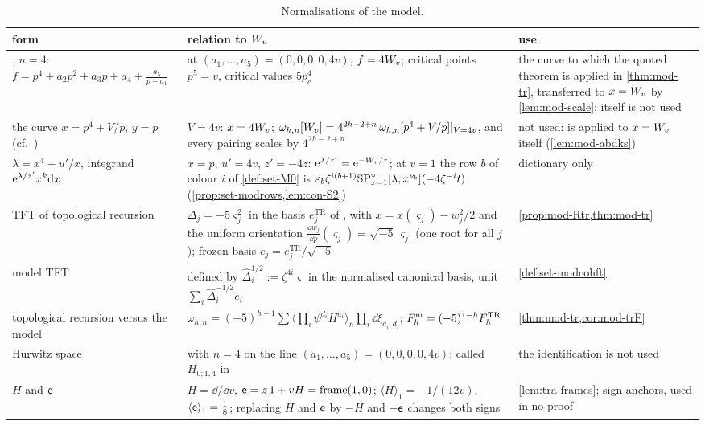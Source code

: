 \begin{table}[ht]
\caption{Normalisations of the model.}
\label{tab:sgn-model}
\centering
\footnotesize
\renewcommand{\arraystretch}{1.2}
\begin{tabular}{@{}>{\raggedright\arraybackslash}p{}>{\raggedright\arraybackslash}p{}>{\raggedright\arraybackslash}p{}@{}}
\hline
form & relation to $W_{v}$ & use \\
\hline
\cite[(8-1)]{Dunin-Barkowski:2015caa}, $n=4$: $f=p^4+a_2p^2+a_3p+a_4+\frac{a_5}{p-a_1}$ & at $(a_1,\dots,a_5)=(0,0,0,0,4v)$, $f=4W_{v}$; critical points $p^5=v$, critical values $5p_c^4$ & the curve to which the quoted theorem is applied in \cref{thm:mod-tr}, transferred to $x=W_{v}$ by \cref{lem:mod-scale}; \cite[\S8]{Dunin-Barkowski:2015caa} itself is not used \\
the curve $x=p^4+V/p$, $y=p$ (cf.\ \cite[(7.2)]{ABDKS25}) & $V=4v$: $x=4W_{v}$; $\omega_{h,n}[W_{v}]=4^{2h-2+n}\,\omega_{h,n}[p^4+V/p]|_{V=4v}$, and every pairing scales by $4^{2h-2+n}$ & not used: \cite[Theorem~7.1]{ABDKS25} is applied to $x=W_{v}$ itself (\cref{lem:mod-abdks}) \\
$\lambda=x^4+u'/x$, integrand $\mathrm{e}^{\lambda/z'}x^k\mathrm{d} x$ & $x=p$, $u'=4v$, $z'=-4z$: $\mathrm{e}^{\lambda/z'}=\mathrm{e}^{-W_{v}/z}$; at $v=1$ the row $b$ of colour $i$ of \cref{def:set-M0} is $\varepsilon_b\zeta^{i(b+1)}\mathrm{SP}^{\circ}_{x=1}[\lambda;x^{\nu_b}](-4\zeta^{-i}t)$ (\cref{prop:set-modrows,lem:con-S2}) & dictionary only \\
TFT of topological recursion & $\Delta_j=-5\varsigma_j^2$ in the basis $e^{\mathrm{TR}}_j$ of \cite[(2-30)]{Dunin-Barkowski:2015caa}, with $x=x(\varsigma_j)-w_j^2/2$ and the uniform orientation $\frac{\dd w_j}{\dd p}(\varsigma_j)=\sqrt{-5}\,\varsigma_j$ (one root for all $j$); frozen basis $\bar e_j=e^{\mathrm{TR}}_j/\sqrt{-5}$ & \cref{prop:mod-Rtr,thm:mod-tr} \\
model TFT & defined by $\hat\Delta_i^{1/2}:=\zeta^{4i}\varsigma$ in the normalised canonical basis, unit $\sum_i\hat\Delta_i^{-1/2}\tilde e_i$ & \cref{def:set-modcohft} \\
topological recursion versus the model & $\omega_{h,n}=(-5)^{h-1}\sum\langle\prod_i\psi^{d_i}H^{a_i}\rangle_h\prod_i\dd\xi_{a_i,d_i}$; $F^{\mathrm{m}}_h=(-5)^{1-h}F^{\mathrm{TR}}_h$ & \cref{thm:mod-tr,cor:mod-trF} \\
Hurwitz space & \cite[(8-1)]{Dunin-Barkowski:2015caa} with $n=4$ on the line $(a_1,\dots,a_5)=(0,0,0,0,4v)$; called $H_{0;1,4}$ in \cite{CvdLPS23} & the identification is not used \\
$H$ and $\mathsf{e}$ & $H=\dd/\dd v$, $\mathsf{e}=z\,1+vH=\mathrm{frame}(1,0)$; $\langle H\rangle_1=-1/(12v)$, $\langle\mathsf{e}\rangle_1=\frac18$; replacing $H$ and $\mathsf{e}$ by $-H$ and $-\mathsf{e}$ changes both signs & \cref{lem:tra-frames}; sign anchors, used in no proof \\
\hline
\end{tabular}
\end{table}



